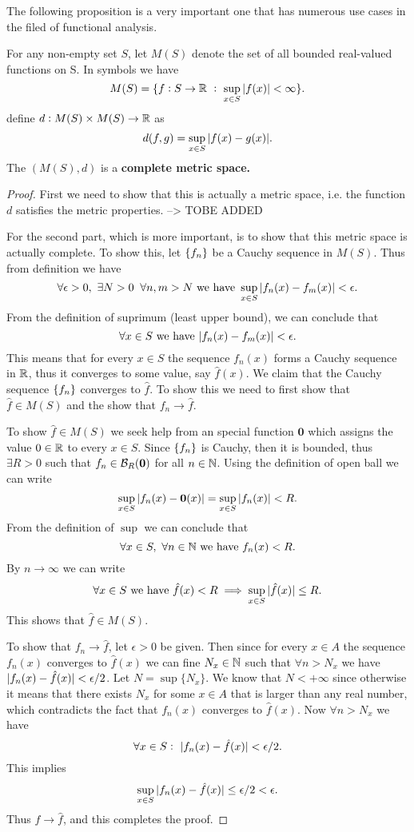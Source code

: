 The following proposition is a very important one that has numerous use cases in the filed of functional analysis.

\begin{proposition}
	For any non-empty set $S$, let $M(S)$ denote the set of all bounded real-valued functions on S. In symbols we have
	\[ M(S) = \{ f:S\to \mathbb{R}\ :\ \sup_{x\in S}|f(x)|< \infty \}. \]
	define $d: M(S)\times M(S) \to \mathbb{R}$ as 
	\[ d(f,g)= \sup_{x\in S}|f(x)-g(x)|. \]
	The $(M(S),d)$ is a \textbf{complete metric space.}
\end{proposition}

\begin{proof}
	First we need to show that this is actually a metric space, i.e. the function $d$ satisfies the metric properties. --> TOBE ADDED
	
	For the second part, which is more important, is to show that this metric space is actually complete. To show this, let $\{f_n\}$ be a Cauchy sequence in $M(S)$. Thus from definition we have
	\[ \forall \epsilon >0,\ \exists N>0\:\ \forall n,m>N \ \text{we have}\  \sup_{x\in S}|f_n(x)-f_m(x)| < \epsilon. \]
	From the definition of suprimum (least upper bound), we can conclude that
	\[ \forall x\in S \ \text{we have}\  |f_n(x) - f_m(x)| < \epsilon. \]
	This means that for every $x\in S$ the sequence $f_n(x)$ forms a Cauchy sequence in $\mathbb{R}$, thus it converges to some value, say $\hat{f}(x)$. We claim that the Cauchy sequence $\{f_n\}$ converges to $\hat{f}$. To show this we need to first show that $\hat{f} \in M(S)$ and the show that $f_n \to \hat{f}$.
	
	To show $\hat{f} \in M(S)$ we seek help from an special function $\textbf{0}$ which assigns the value $0 \in \mathbb{R}$ to every $x\in S$. Since $\{f_n\}$ is Cauchy, then it is bounded, thus $\exists R > 0$ such that $f_n \in \mathcal{B}_{R}(\textbf{0})$ for all $n \in \mathbb{N}$. Using the definition of open ball we can write
	\[ \sup_{x\in S}|f_n(x) - \textbf{0}(x)| = \sup_{x\in S}|f_n(x)| < R. \]
	From the definition of $\sup$ we can conclude that 
	\[ \forall x\in S,\ \forall n\in \N \wh f_n(x) < R. \]
	By $n\to \infty$ we can write
	\[ \forall x\in S \ \text{we have}\  \hat{f}(x) < R \implies \sup_{x\in S}|\hat{f}(x)| \leq R. \]
	This shows that $\hat{f} \in M(S)$.
	
	To show that $f_n \to \hat{f}$, let $\epsilon>0$ be given. Then since for every $x\in A$ the sequence $f_n(x)$ converges to $\hat{f}(x)$ we can fine $N_x \in \mathbb{N}$ such that $\forall n > N_x$ we have $|f_n(x) - \hat{f}(x)| < \epsilon/2$. Let $N = \sup\{N_x\}$. We know that $N < +\infty$ since otherwise it means that there exists $N_x$ for some $x\in A$ that is larger than any real number, which contradicts the fact that $f_n(x)$ converges to $\hat{f}(x)$. Now $\forall n>N_x$ we have
	\[ \forall x\in S:\ |f_n(x) - \hat{f}(x)| < \epsilon/2. \]
	This implies
	\[ \sup_{x\in S} |f_n(x) - \hat{f}(x)| \leq \epsilon/2 < \epsilon. \]
	Thus $f \to \hat{f}$, and this completes the proof.
\end{proof}


